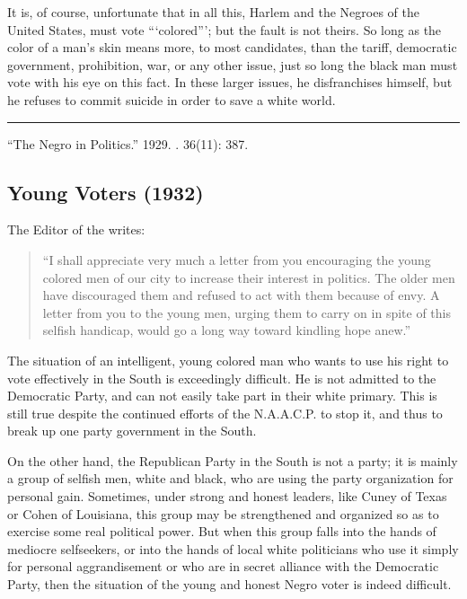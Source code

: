 \documentclass[letterpaper,10pt,english]{jupyterBook}
\begin{document}
\sphinxAtStartPar
It is, of course, unfortunate that in all this, Harlem and the Negroes of the United States, must vote “‘colored”’; but the fault is not theirs. So long as the color of a man’s skin means more, to most candidates, than the tariff, democratic government, prohibition, war, or any other issue, just so long  the black man must vote with his eye on this fact. In these larger issues, he disfranchises himself, but he refuses to commit suicide in order to save a white world.


\bigskip\hrule\bigskip


\sphinxAtStartPar
{} “The Negro in Politics.” 1929. . 36(11): 387.


\subsection{Young Voters (1932)}
\label{\detokenize{Volumes/39/09/young_voters:young-voters-1932}}\label{\detokenize{Volumes/39/09/young_voters::doc}}
\sphinxAtStartPar
The Editor of the  writes:
\begin{quote}

\sphinxAtStartPar
“I shall appreciate very much a letter from you encouraging the young colored men of our city to increase their interest in politics. The older men have discouraged them and refused to act with them because of envy. A letter from you to the young men, urging them to carry on in spite of this selfish handicap, would go a long way toward kindling hope anew.”
\end{quote}

\sphinxAtStartPar
The situation of an intelligent, young colored man who wants to use his right to vote effectively in the South is exceedingly difficult. He is not admitted to the Democratic Party, and can not easily take part in their white primary. This is still true despite the continued efforts of the N.A.A.C.P. to stop it, and thus to break up one party government in the South.

\sphinxAtStartPar
On the other hand, the Republican Party in the South is not a party; it is mainly a group of selfish men, white and black, who are using the party organization for personal gain. Sometimes, under strong and honest leaders, like Cuney of Texas or Cohen of Louisiana, this group may be strengthened and organized so as to exercise some real political power. But when this group falls into the hands of mediocre self\sphinxhyphen{}seekers, or into the hands of local white politicians who use it simply for personal aggrandisement or who are in secret alliance with the Democratic Party, then the situation of the young and honest Negro voter is indeed difficult.
\end{document}
